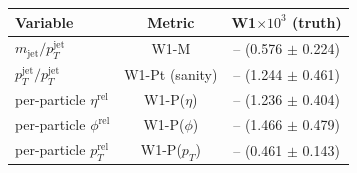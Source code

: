 \begin{ruledtabular}
  \begin{tabular}{lcc}
  \textbf{Variable} & \textbf{Metric} & \textbf{W1}$\times 10^3$ (truth) \\
  \hline
  $m_\mathrm{jet}/p_T^\mathrm{jet}$ & W1-M & -- (0.576 $\pm$ 0.224) \\
  $p_T^\mathrm{jet}/p_T^\mathrm{jet}$ & W1-Pt (sanity) & -- (1.244 $\pm$ 0.461) \\
  per-particle $\eta^\mathrm{rel}$ & W1-P($\eta$) & -- (1.236 $\pm$ 0.404) \\
  per-particle $\phi^\mathrm{rel}$ & W1-P($\phi$) & -- (1.466 $\pm$ 0.479) \\
  per-particle $p_T^\mathrm{rel}$ & W1-P($p_T$) & -- (0.461 $\pm$ 0.143) \\
  \end{tabular}
\end{ruledtabular}
